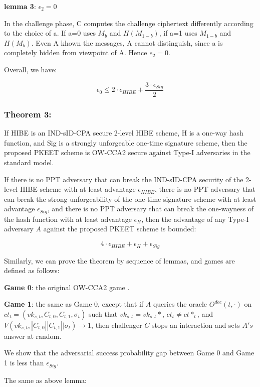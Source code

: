 \documentclass[
]{article}
\begin{document}
\textbf{lemma 3}: \(\epsilon_2 = 0\)

In the challenge phase, C computes the challenge ciphertext differently
according to the choice of a. If a=0 uses \(M_b\) and \(H(M_{1-b})\), if
a=1 uses \(M_{1-b}\) and \(H(M_b)\). Even A khown the messages, A cannot
distinguish, since a is completely hidden from viewpoint of A. Hence
\(e_2 = 0\).

Overall, we have:

\[
\epsilon_0 \leq 2\cdot \epsilon_{HIBE}+ \frac{3\cdot \epsilon_{Sig}}{2}
\]

\hypertarget{theorem-3}{%
\subsubsection{Theorem 3:}\label{theorem-3}}

If HIBE is an IND-sID-CPA secure 2-level HIBE scheme, H is a one-way
hash function, and Sig is a strongly unforgeable one-time signature
scheme, then the proposed PKEET scheme is OW-CCA2 secure against Type-I
adversaries in the standard model.

If there is no PPT adversary that can break the IND-sID-CPA security of
the 2-level HIBE scheme with at least advantage \(\epsilon_{HIBE}\),
there is no PPT adversary that can break the strong unforgeability of
the one-time signature scheme with at least advantage
\(\epsilon_{Sig}\), and there is no PPT adversary that can break the
one-wayness of the hash function with at least advantage \(\epsilon_H\),
then the advantage of any Type-I adversary \(A\) against the proposed
PKEET scheme is bounded:

\[
4\cdot \epsilon_{HIBE}+ \epsilon_H + \epsilon_{Sig}
\]

Similarly, we can prove the theorem by sequence of lemmas, and games are
defined as follows:

\textbf{Game 0}: the original OW-CCA2 game .

\textbf{Game 1}: the same as Game 0, except that if \(A\) queries the
oracle \(O^{dec}(t,\cdot)\) on
\(ct_t=(vk_{s,t},C_{t,0},C_{t,1},\sigma_t)\) such that
\(vk_{s,t} = vk_{s,t}*\), \(ct_t \neq ct*_t\), and
\(V(vk_{s,t},|C_{t,0}||C_{t,1}||\sigma_t)\rightarrow 1\), then
challenger \(C\) stops an interaction and sets \(A's\) answer at random.

We show that the adversarial success probability gap between Game 0 and
Game 1 is less than \(\epsilon_{Sig}\).

The same as above lemma:
\end{document}
